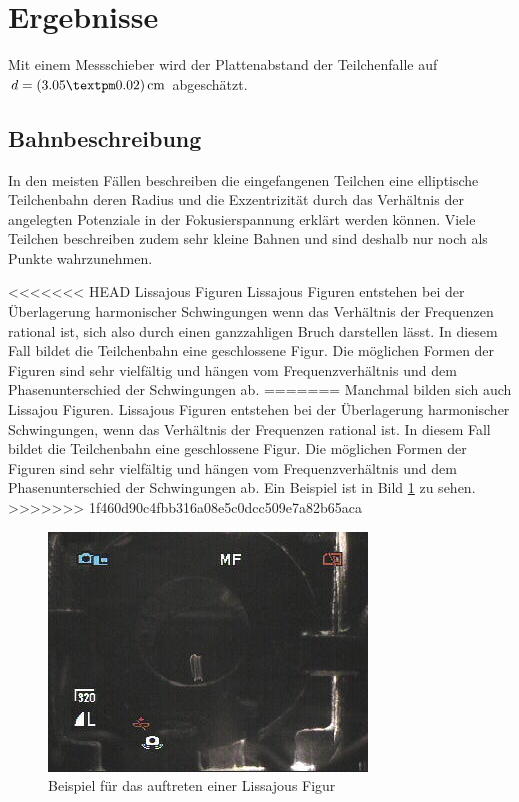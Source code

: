 \documentclass[a4paper,12pt]{article}
\begin{document}
\section{Ergebnisse}
Mit einem Messschieber wird der Plattenabstand der Teilchenfalle auf $d = \unit[(3.05±0.02)]{cm}$ abgeschätzt.
\subsection{Bahnbeschreibung}
In den meisten Fällen beschreiben die eingefangenen Teilchen eine elliptische Teilchenbahn deren Radius und die Exzentrizität durch das Verhältnis der angelegten Potenziale in der Fokusierspannung erklärt werden können.
Viele Teilchen beschreiben zudem sehr kleine Bahnen und sind deshalb nur noch als Punkte wahrzunehmen.

<<<<<<< HEAD
Lissajous Figuren
Lissajous Figuren entstehen bei der Überlagerung harmonischer Schwingungen wenn das Verhältnis der Frequenzen rational ist, sich also durch einen ganzzahligen Bruch darstellen lässt. 
In diesem Fall bildet die Teilchenbahn eine geschlossene
Figur. Die möglichen Formen der Figuren sind sehr vielfältig und hängen vom Frequenzverhältnis und dem Phasenunterschied der Schwingungen ab. 
=======
Manchmal bilden sich auch Lissajou Figuren. Lissajous Figuren entstehen bei der Überlagerung harmonischer Schwingungen, wenn das Verhältnis der Frequenzen rational ist.
In diesem Fall bildet die Teilchenbahn eine geschlossene Figur.
Die möglichen Formen der Figuren sind sehr vielfältig und hängen vom Frequenzverhältnis und dem Phasenunterschied der Schwingungen ab.
Ein Beispiel ist in Bild \ref{Lissjous} zu sehen.
>>>>>>> 1f460d90c4fbb316a08e5c0dcc509e7a82b65aca

\begin{figure}[htb]
		\centering
		\includegraphics{lisa1.jpg}
		\caption{Beispiel für das auftreten einer Lissajous Figur}
		\label{Lissjous}
\end{figure}
\end{document}
